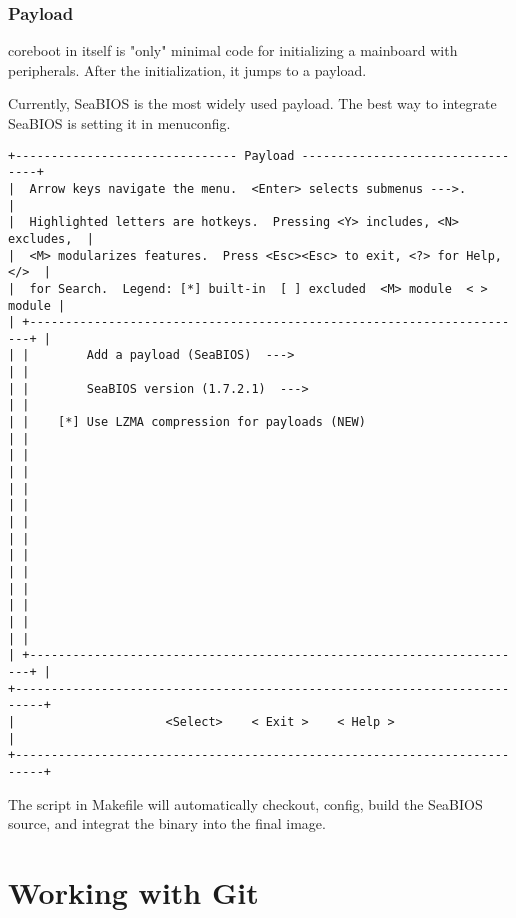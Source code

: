 \documentclass[titlepage,12pt]{article}
\begin{document}
\subsubsection{Payload}
coreboot in itself is "only" minimal code for initializing a mainboard
with peripherals. After the initialization, it jumps to a payload.

Currently, SeaBIOS is the most widely used payload. The best way to integrate SeaBIOS
is setting it in menuconfig.
{ \small
\begin{verbatim}
+------------------------------- Payload ---------------------------------+
|  Arrow keys navigate the menu.  <Enter> selects submenus --->.           |
|  Highlighted letters are hotkeys.  Pressing <Y> includes, <N> excludes,  |
|  <M> modularizes features.  Press <Esc><Esc> to exit, <?> for Help, </>  |
|  for Search.  Legend: [*] built-in  [ ] excluded  <M> module  < > module |
| +----------------------------------------------------------------------+ |
| |        Add a payload (SeaBIOS)  --->                                 | |
| |        SeaBIOS version (1.7.2.1)  --->                               | |
| |    [*] Use LZMA compression for payloads (NEW)                       | |
| |                                                                      | |
| |                                                                      | |
| |                                                                      | |
| |                                                                      | |
| |                                                                      | |
| |                                                                      | |
| +----------------------------------------------------------------------+ |
+--------------------------------------------------------------------------+
|                     <Select>    < Exit >    < Help >                     |
+--------------------------------------------------------------------------+
\end{verbatim}
The script in Makefile will automatically checkout, config, build the SeaBIOS source,
and integrat the binary into the final image.

%
%

\section{Working with Git}
}
\end{document}
